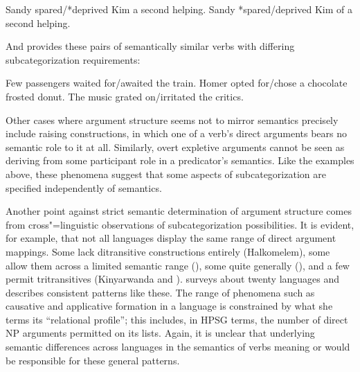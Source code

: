 \documentclass[output=paper
 	        ,biblatex
                ,babelshorthands
                ,newtxmath
                ,draftmode
                ,colorlinks, citecolor=brown
]{langscibook}
\begin{document}
\eal
\ex    Sandy spared/*deprived Kim a second helping.
\ex    Sandy *spared/deprived Kim of a second helping.
\zl

\noindent
And \citet[ex.\ 5.4]{Davis2001} provides these pairs of semantically similar verbs with differing subcategorization requirements:

\eal
\label{ard-subcat-ex}
\ex    Few passengers waited for/awaited the train.
\ex    Homer opted for/chose a chocolate frosted donut.
\ex    The music grated on/irritated the critics.
\zl

\noindent
Other cases where argument structure seems not to mirror semantics precisely include raising
constructions, in which one of a verb's direct arguments bears no semantic role to it at all.
Similarly, overt expletive arguments cannot be seen as deriving from some participant role in a
predicator's semantics.  Like the examples above, these phenomena suggest that some aspects of
subcategorization are specified independently of semantics.

Another point against strict semantic determination of argument structure comes from cross"=linguistic observations of subcategorization possibilities.
It is evident, for example, that not all languages display the same range of direct argument mappings.
Some lack ditransitive constructions entirely (Halkomelem), some allow them across a limited semantic range (), some quite generally (), and a few permit tritransitives (Kinyarwanda and ).
\citet{Gerdts1992} surveys about twenty languages and describes consistent patterns like these.
The range of phenomena such as causative and applicative formation in a language is constrained by what she terms its ``relational profile''; this includes, in HPSG terms, the number of direct NP arguments permitted on its \argst lists.
Again, it is unclear that underlying semantic differences across languages in the semantics of verbs meaning  or  would be responsible for these general patterns.

\end{document}
